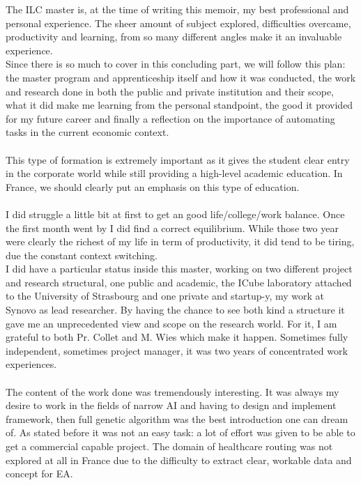 \documentclass[12pt]{memoir}
\begin{document}
The ILC master is, at the time of writing this memoir, my best professional and personal experience.
The sheer amount of subject explored, difficulties overcame, productivity and learning, from so many
different angles make it an invaluable experience.\\
Since there is so much to cover in this concluding part, we will follow this plan: the master program and apprenticeship
itself and how it was conducted, the work and research done in both the public and private institution and their scope,
what it did make me learning from the personal standpoint, the good it provided for my future career and finally a
reflection on the importance of automating tasks in the current economic context.\\
\\
This type of formation is extremely important as it gives the student clear entry in the corporate world while
still providing a high-level academic education. In France, we should clearly put an emphasis on this type of education.\\
\\
I did struggle a little bit at first to get an good life/college/work balance. Once the first month went by I did find
a correct equilibrium. While those two year were clearly the richest of my life in term of productivity, it did tend to
be tiring, due the constant context switching.\\
I did have a particular status inside this master, working on two different project and research structural,
one public and academic, the ICube laboratory attached to the University of Strasbourg and one private and
startup-y, my work at Synovo as lead researcher. By having the chance to see both kind a structure it gave me an
unprecedented view and scope on the research world. For it, I am grateful to both Pr. Collet and M. Wies which make it happen.
Sometimes fully independent, sometimes project manager, it was two years of concentrated work experiences.\\
\\
The content of the work done was tremendously interesting. It was always my desire to work in the fields of narrow AI and
having to design and implement framework, then full genetic algorithm was the best introduction one can dream of. As stated before
it was not an easy task: a lot of effort was given to be able to get a commercial capable project. The domain of healthcare routing
was not explored at all in France due to the difficulty to extract clear, workable data and concept for EA.\\
\end{document}
